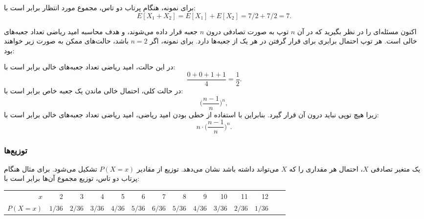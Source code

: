 برای نمونه، هنگام پرتاب دو تاس،
مجموع مورد انتظار برابر است با:
\[E[X_1+X_2]=E[X_1]+E[X_2]=7/2+7/2=7.\]

اکنون مسئله‌ای را در نظر بگیرید که در آن
$n$ توپ به صورت تصادفی درون $n$ جعبه قرار داده می‌شوند،
و هدف محاسبه امید ریاضی تعداد جعبه‌های خالی است.
هر توپ احتمال برابری برای قرار گرفتن
در هر یک از جعبه‌ها دارد.
برای نمونه، اگر $n=2$ باشد، حالت‌های ممکن
به صورت زیر خواهند بود:
\begin{center}
\end{center}
در این حالت، امید ریاضی تعداد جعبه‌های خالی برابر است با:
\[\frac{0+0+1+1}{4} = \frac{1}{2}.\]
در حالت کلی، احتمال خالی ماندن یک جعبه خاص برابر است با:
\[\Big(\frac{n-1}{n}\Big)^n,\]
زیرا هیچ توپی نباید درون آن قرار گیرد.
بنابراین با استفاده از خطی بودن امید ریاضی، امید ریاضی تعداد جعبه‌های خالی برابر است با:
\[n \cdot \Big(\frac{n-1}{n}\Big)^n.\]

\subsubsection{توزیع‌ها}


 یک متغیر تصادفی $X$، احتمال هر مقداری را که $X$ می‌تواند داشته باشد نشان می‌دهد.
توزیع از مقادیر $P(X=x)$ تشکیل می‌شود.
برای مثال هنگام پرتاب دو تاس، توزیع مجموع آن‌ها برابر است با:
\begin{center}
\small {
\begin{tabular}{r|rrrrrrrrrrrrr}
$x$ & 2 & 3 & 4 & 5 & 6 & 7 & 8 & 9 & 10 & 11 & 12 \\
$P(X=x)$ & $1/36$ & $2/36$ & $3/36$ & $4/36$ & $5/36$ & $6/36$ & $5/36$ & $4/36$ & $3/36$ & $2/36$ & $1/36$ \\
\end{tabular}
}
\end{center}

